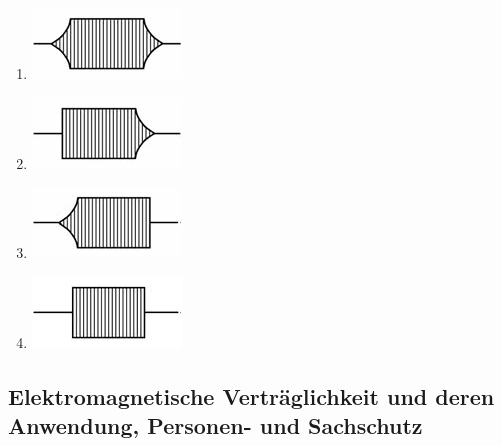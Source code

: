 \documentclass[8pt]{article}
\begin{document}
\begin{enumerate}[nolistsep,label=\Alph*]
\item
\begin{center}
	\begin{minipage}{\linewidth}
		\centering
		\includegraphics[scale=1.0]{pics/tk318_a.jpg}
	\end{minipage}
\end{center}
\item
\begin{center}
	\begin{minipage}{\linewidth}
		\centering
		\includegraphics[scale=1.0]{pics/tk318_b.jpg}
	\end{minipage}
\end{center}
\item
\begin{center}
	\begin{minipage}{\linewidth}
		\centering
		\includegraphics[scale=1.0]{pics/tk318_c.jpg}
	\end{minipage}
\end{center}
\item
\begin{center}
	\begin{minipage}{\linewidth}
		\centering
		\includegraphics[scale=1.0]{pics/tk318_d.jpg}
	\end{minipage}
\end{center}
\end{enumerate}

\pagebreak
\subsection{Elektromagnetische Verträglichkeit und deren Anwendung, Personen- und Sachschutz}
\end{document}
